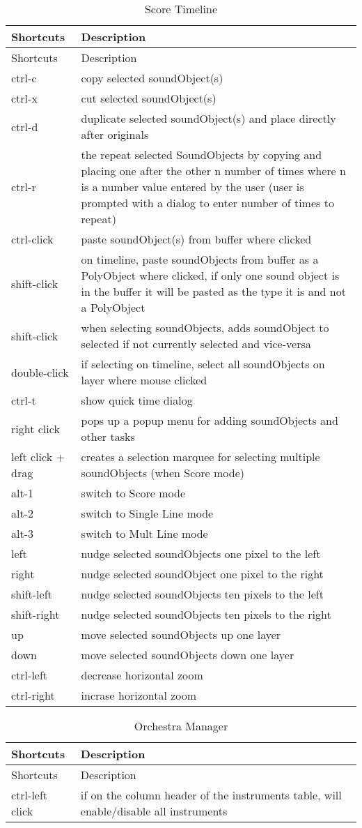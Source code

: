 \begin{longtable}[]{@{}ll@{}}
\caption{Score Timeline}\tabularnewline
\toprule
Shortcuts & Description\tabularnewline
\midrule
\endfirsthead
\toprule
Shortcuts & Description\tabularnewline
\midrule
\endhead
ctrl-c & copy selected soundObject(s)\tabularnewline
ctrl-x & cut selected soundObject(s)\tabularnewline
ctrl-d & duplicate selected soundObject(s) and place directly after
originals\tabularnewline
ctrl-r & the repeat selected SoundObjects by copying and placing one
after the other n number of times where n is a number value entered by
the user (user is prompted with a dialog to enter number of times to
repeat)\tabularnewline
ctrl-click & paste soundObject(s) from buffer where
clicked\tabularnewline
shift-click & on timeline, paste soundObjects from buffer as a
PolyObject where clicked, if only one sound object is in the buffer it
will be pasted as the type it is and not a PolyObject\tabularnewline
shift-click & when selecting soundObjects, adds soundObject to selected
if not currently selected and vice-versa\tabularnewline
double-click & if selecting on timeline, select all soundObjects on
layer where mouse clicked\tabularnewline
ctrl-t & show quick time dialog\tabularnewline
right click & pops up a popup menu for adding soundObjects and other
tasks\tabularnewline
left click + drag & creates a selection marquee for selecting multiple
soundObjects (when Score mode)\tabularnewline
alt-1 & switch to Score mode\tabularnewline
alt-2 & switch to Single Line mode\tabularnewline
alt-3 & switch to Mult Line mode\tabularnewline
left & nudge selected soundObjects one pixel to the left\tabularnewline
right & nudge selected soundObject one pixel to the right\tabularnewline
shift-left & nudge selected soundObjects ten pixels to the
left\tabularnewline
shift-right & nudge selected soundObjects ten pixels to the
right\tabularnewline
up & move selected soundObjects up one layer\tabularnewline
down & move selected soundObjects down one layer\tabularnewline
ctrl-left & decrease horizontal zoom\tabularnewline
ctrl-right & incrase horizontal zoom\tabularnewline
\bottomrule
\end{longtable}

\begin{longtable}[]{@{}ll@{}}
\caption{Orchestra Manager}\tabularnewline
\toprule
Shortcuts & Description\tabularnewline
\midrule
\endfirsthead
\toprule
Shortcuts & Description\tabularnewline
\midrule
\endhead
ctrl-left click & if on the column header of the instruments table, will
enable/disable all instruments\tabularnewline
\bottomrule
\end{longtable}

